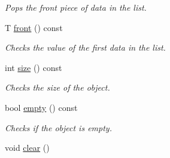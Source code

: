 \begin{DoxyCompactItemize}
\begin{DoxyCompactList}\small\item\em Pops the front piece of data in the list. \end{DoxyCompactList}\item 
\hypertarget{class_c_s170_1_1_list_a6af6e8fde524307f9a629bf36139d89a}{T \hyperlink{class_c_s170_1_1_list_a6af6e8fde524307f9a629bf36139d89a}{front} () const }\label{class_c_s170_1_1_list_a6af6e8fde524307f9a629bf36139d89a}

\begin{DoxyCompactList}\small\item\em Checks the value of the first data in the list. \end{DoxyCompactList}\item 
int \hyperlink{class_c_s170_1_1_list_a888f823e05765669c8e207a104eef36e}{size} () const 
\begin{DoxyCompactList}\small\item\em Checks the size of the object. \end{DoxyCompactList}\item 
bool \hyperlink{class_c_s170_1_1_list_a636fc31e26447e2a58a4f31d5af0e9cc}{empty} () const 
\begin{DoxyCompactList}\small\item\em Checks if the object is empty. \end{DoxyCompactList}\item 
\hypertarget{class_c_s170_1_1_list_a4f8c628dff02f39eb45df0187e391837}{void \hyperlink{class_c_s170_1_1_list_a4f8c628dff02f39eb45df0187e391837}{clear} ()}\label{class_c_s170_1_1_list_a4f8c628dff02f39eb45df0187e391837}


\end{DoxyCompactItemize}

